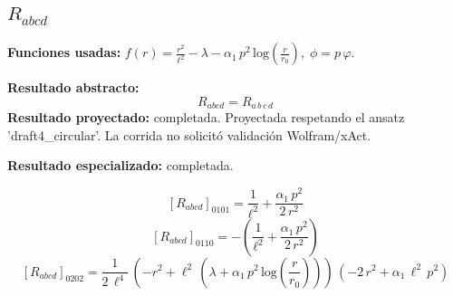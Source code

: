 \documentclass[11pt]{article}
\begin{document}
\subsection*{$ R_{abcd} $}
\textbf{Funciones usadas:} $ f\!\left(r\right) = \frac{{r}^{2}}{{\ell}^{2}} - \lambda - \alpha_{1}\,{p}^{2}\,\mathrm{log}\!\left(\frac{r}{r_{0}}\right),\;\phi=p\,\varphi $.\par
\textbf{Resultado abstracto:}
\begin{dmath*}[breakdepth={5}]
R_{abcd} = R{}_{a\,b\,c\,d}
\end{dmath*}
\textbf{Resultado proyectado:} completada. Proyectada respetando el ansatz 'draft4\_circular'. La corrida no solicitó validación Wolfram/xAct.\par
\textbf{Resultado especializado:} completada.\par
\begin{dmath*}[breakdepth={5}]
\left[R_{abcd}\right]_{0101} = \frac{1}{{\ell}^{2}} + \frac{\alpha_{1}\,{p}^{2}}{2\,{r}^{2}}
\end{dmath*}
\begin{dmath*}[breakdepth={5}]
\left[R_{abcd}\right]_{0110} = -\left(\frac{1}{{\ell}^{2}} + \frac{\alpha_{1}\,{p}^{2}}{2\,{r}^{2}}\right)
\end{dmath*}
\begin{dmath*}[breakdepth={5}]
\left[R_{abcd}\right]_{0202} = \frac{1}{2\,{\ell}^{4}}\,\left(-{r}^{2} + {\ell}^{2}\,\left(\lambda + \alpha_{1}\,{p}^{2}\,\mathrm{log}\!\left(\frac{r}{r_{0}}\right)\right)\right)\,\left(-2\,{r}^{2} + \alpha_{1}\,{\ell}^{2}\,{p}^{2}\right)
\end{dmath*}
\end{document}

